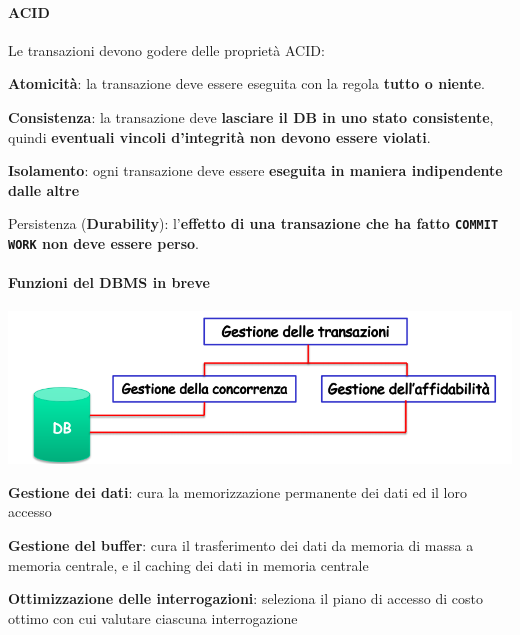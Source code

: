 \documentclass[10pt]{book}
\begin{document}
\paragraph{ACID} Le transazioni devono godere delle proprietà ACID:
\begin{list}{}{}
	\item \textbf{Atomicità}: la transazione deve essere eseguita con la regola \textbf{tutto o niente}.
	\item \textbf{Consistenza}: la transazione deve \textbf{lasciare il DB in uno stato consistente}, quindi \textbf{eventuali vincoli d'integrità non devono essere violati}.
	\item \textbf{Isolamento}: ogni transazione deve essere \textbf{eseguita in maniera indipendente dalle altre}
	\item Persistenza (\textbf{Durability}): l'\textbf{effetto di una transazione che ha fatto \texttt{COMMIT WORK} non deve essere perso}.
\end{list}
\paragraph{Funzioni del DBMS in breve}
\begin{center}
	\includegraphics[scale=0.75]{funzdbbreve.png}
\end{center}
\begin{list}{}{}
	\item \textbf{Gestione dei dati}: cura la memorizzazione permanente dei dati ed il loro accesso
	\item \textbf{Gestione del buffer}: cura il trasferimento dei dati da memoria di massa a memoria centrale, e il caching dei dati in memoria centrale
	\item \textbf{Ottimizzazione delle interrogazioni}: seleziona il piano di accesso di costo ottimo con cui valutare ciascuna interrogazione
\end{list}
\pagebreak
\end{document}
